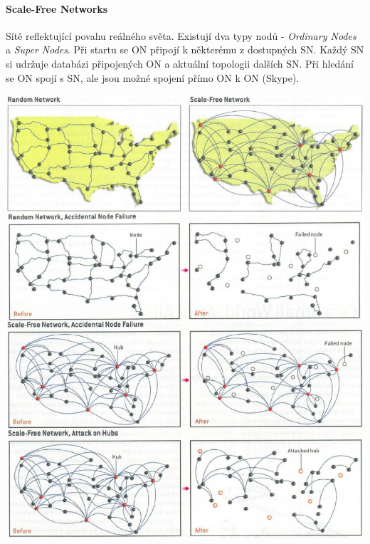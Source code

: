 \documentclass{scrreprt}
\begin{document}
\paragraph*{Scale-Free Networks} Sítě reflektující povahu reálného světa. Existují dva typy nodů - \emph{Ordinary Nodes} a \emph{Super Nodes}. Při startu se ON připojí k některému z dostupných SN. Každý SN si udržuje databázi připojených ON a aktuální topologii dalších SN. Při hledání se ON spojí s SN, ale jsou možné spojení přímo ON k ON (Skype).

\begin{center}
\includegraphics[width=\linewidth]{img/networks}
\end{center}
\end{document}
